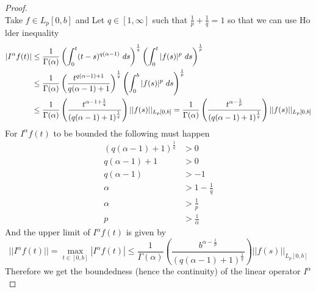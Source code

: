 \begin{proof}[Proof]
    \,\\
    Take $f \in L_p[0, b]$ and Let $q \in [1,\infty]$ such that $\frac{1}{p}+\frac{1}{q} = 1$
    so that we can use H$\ddot{\text{o}}$lder inequality
    \begin{align*}
        |I^{\alpha}f(t)| &\leq \frac{1}{\Gamma(\alpha)} \left(  \int_{0}^{t}(t-s)^{q(\alpha-1)} \,\, ds \right)^{\frac{1}{q}} \left(  \int_{0}^{t}|f(s)|^{p} \,\, ds \right)^{\frac{1}{p}}
        \\
        &\leq \frac{1}{\Gamma(\alpha)} \left(  \frac{t^{q(\alpha-1)+1}}{q(\alpha-1)+1} \right)^{\frac{1}{q}} \left(  \int_{0}^{b}|f(s)|^{p} \,\, ds \right)^{\frac{1}{p}}
        \\
        &\leq \frac{1}{\Gamma(\alpha)} \left(  \frac{t^{\alpha-1+\frac{1}{q}}}{{\left( q(\alpha-1)+1 \right)}^{\frac{1}{q}}} \right) ||f(s)||_{L_p[0,b]} = \frac{1}{\Gamma(\alpha)} \left(  \frac{t^{\alpha-\frac{1}{p}}}{{\left( q(\alpha-1)+1 \right)}^{\frac{1}{q}}} \right) ||f(s)||_{L_p[0,b]}
    \end{align*}
    For $I^{\alpha}f(t)$ to be bounded the following must happen 
    \begin{align*}
        \left( q(\alpha-1)+1 \right)^{\frac{1}{q}} &> 0
        \\
        q(\alpha-1)+1 &> 0
        \\
        q(\alpha-1) &> -1
        \\
        \alpha &> 1-\frac{1}{q}
        \\
        \alpha &> \frac{1}{p}
        \\
        p &> \frac{1}{\alpha}
    \end{align*}
    And the upper limit of $I^{\alpha}f(t)$ is given by
    \[
        ||I^\alpha f(t)|| = \max\limits_{t\in[0,b]}|I^\alpha f(t)| \leq \frac{1}{\Gamma(\alpha)} \left(  \frac{b^{\alpha-\frac{1}{p}}}{{\left( q(\alpha-1)+1 \right)}^{\frac{1}{q}}} \right) ||f(s)||_{L_p[0,b]}
    \]
    Therefore we get the boundedness (hence the continuity) of the linear operator $I^{\alpha}$


\end{proof}
